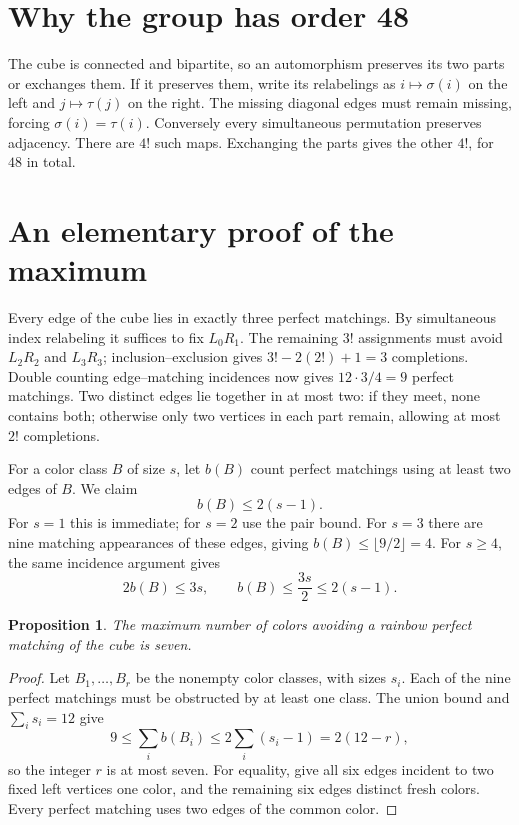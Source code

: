 \documentclass[11pt,letterpaper]{article}
\newtheorem{proposition}{Proposition}
\begin{document}
\section{Why the group has order 48}
The cube is connected and bipartite, so an automorphism preserves its two
parts or exchanges them. If it preserves them, write its relabelings as
$i\mapsto\sigma(i)$ on the left and $j\mapsto\tau(j)$ on the right.
The missing diagonal edges must remain missing, forcing $\sigma(i)=\tau(i)$.
Conversely every simultaneous permutation preserves adjacency. There are
$4!$ such maps. Exchanging the parts gives the other $4!$, for $48$ in total.

\newpage
\section{An elementary proof of the maximum}
Every edge of the cube lies in exactly three perfect matchings.
By simultaneous index relabeling it suffices to fix $L_0R_1$.
The remaining $3!$ assignments must avoid $L_2R_2$ and $L_3R_3$;
inclusion--exclusion gives $3!-2(2!)+1=3$ completions.
Double counting edge--matching incidences now gives $12\cdot3/4=9$
perfect matchings. Two distinct edges lie together in at most two:
if they meet, none contains both; otherwise only two vertices in each
part remain, allowing at most $2!$ completions.

For a color class $B$ of size $s$, let $b(B)$ count perfect matchings using
at least two edges of $B$. We claim
\[
 b(B)\le 2(s-1).
\]
For $s=1$ this is immediate; for $s=2$ use the pair bound.
For $s=3$ there are nine matching appearances of these edges, giving
$b(B)\le\lfloor9/2\rfloor=4$. For $s\ge4$, the same incidence argument gives
\[
 2b(B)\le3s,\qquad b(B)\le\frac{3s}{2}\le2(s-1).
\]
\begin{proposition}
The maximum number of colors avoiding a rainbow perfect matching of the cube
is seven.
\end{proposition}
\begin{proof}
Let $B_1,\ldots,B_r$ be the nonempty color classes, with sizes $s_i$.
Each of the nine perfect matchings must be obstructed by at least one class.
The union bound and $\sum_i s_i=12$ give
\[
 9\le\sum_i b(B_i)\le2\sum_i(s_i-1)=2(12-r),
\]
so the integer $r$ is at most seven. For equality, give all six edges incident
to two fixed left vertices one color, and the remaining six edges distinct
fresh colors. Every perfect matching uses two edges of the common color.
\end{proof}
\end{document}
